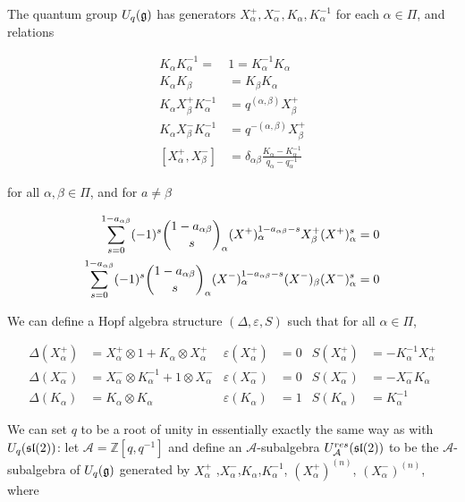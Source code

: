     \begin{defn}
    \label{UqgDef}
        The quantum group $U_q(\mathfrak{g})$ has generators
        $ X^+ _\alpha, X^-_\alpha, K_\alpha, K_\alpha^{-1}$ for each $\alpha \in
        \Pi$, and relations

        \begin{align}
            K_\alpha K_\alpha^{-1} =\ &1  = K_\alpha^{-1}K_\alpha \\
            K_\alpha K_\beta &= K_\beta K_\alpha \\
            K_\alpha  X^+ _\beta K_\alpha^{-1} &= q^{(\alpha, \beta)}  X^+ _\beta \\
            K_\alpha X^-_\beta K_\alpha^{-1} &= q^{-(\alpha, \beta)}  X^+ _\beta \\
            [ X^+ _\alpha, X^-_\beta] &= \delta_{\alpha\beta} \frac{K_\alpha - K_\alpha^{-1}}{ q_\alpha - q_\alpha^{-1}} 
        \end{align}

        for all $\alpha, \beta \in \Pi$, and for $a \neq \beta$

        \begin{align}
            \sum_{s=0}^{1-a_{\alpha\beta}} (-1)^s \dbinom{1-a_{\alpha\beta}}{s}_\alpha  (X^+)_\alpha^{1-a_{\alpha\beta} - s}  X^+_\beta  (X^+)_\alpha^s  &= 0 \\
            \sum_{s=0}^{1-a_{\alpha\beta}} (-1)^s \dbinom{1-a_{\alpha\beta}}{s}_\alpha (X^-)_\alpha^{1-a_{\alpha\beta} - s} (X^-)_\beta (X^-)_\alpha^s  &= 0 
        \end{align}
    \end{defn}

We can define a Hopf algebra structure $(\Delta, \varepsilon, S)$ such
that for all $\alpha \in \Pi$,

    \begin{align}
        \Delta( X^+ _\alpha) &=  X^+ _\alpha \otimes 1 + K_\alpha \otimes  X^+ _\alpha      & \varepsilon( X^+ _\alpha) &= 0  & S( X^+ _\alpha) &= -K_\alpha^{-1}  X^+ _\alpha \\
        \Delta(X^-_\alpha) &= X^-_\alpha \otimes K_\alpha^{-1} + 1 \otimes X^-_\alpha & \varepsilon(X^-_\alpha) &= 0  & S(X^-_\alpha) &= -X^-_\alpha K_\alpha \\
        \Delta(K_\alpha) &= K_\alpha \otimes K_\alpha                           & \varepsilon(K_\alpha) &= 1  & S(K_\alpha) &= K_\alpha^{-1}
    \end{align}


We can set $q$ to be a root of unity in essentially exactly the same way as
with $U_q(\mathfrak{sl}(2))$: let $\mathcal{A} = \mathbb{Z}[q,q^{-1}]$ and define an 
$\mathcal{A}$-subalgebra $U_\mathcal{A}^{res}(\mathfrak{sl}(2))$ to be the
$\mathcal{A}$-subalgebra of $U_q(\mathfrak{g})$ generated by $ X_\alpha^+$
,$X_\alpha^-$,$K_\alpha$,$K_\alpha^{-1}$, $(X_\alpha^+) ^{(n)}$,
$(X_\alpha^-)^{(n)}$, where


